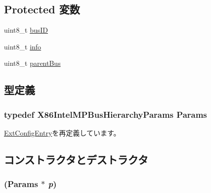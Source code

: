 \subsection*{Protected 変数}
\begin{DoxyCompactItemize}
\item 
uint8\_\-t \hyperlink{classX86ISA_1_1IntelMP_1_1BusHierarchy_ac86b1934f811ad40b20b27d29c52a5d3}{busID}
\item 
uint8\_\-t \hyperlink{classX86ISA_1_1IntelMP_1_1BusHierarchy_a3b5693c71298b922c6188573f2474227}{info}
\item 
uint8\_\-t \hyperlink{classX86ISA_1_1IntelMP_1_1BusHierarchy_a41f801fc3a61f3e7791b38d67321b6f5}{parentBus}
\end{DoxyCompactItemize}


\subsection{型定義}
\hypertarget{classX86ISA_1_1IntelMP_1_1BusHierarchy_a58526583d25b12675822cc32f4617567}{
\subsubsection[{Params}]{\setlength{\rightskip}{0pt plus 5cm}typedef X86IntelMPBusHierarchyParams {\bf Params}}}
\label{classX86ISA_1_1IntelMP_1_1BusHierarchy_a58526583d25b12675822cc32f4617567}


\hyperlink{classX86ISA_1_1IntelMP_1_1ExtConfigEntry_ac05617332b889b2a33387663c048f2a9}{ExtConfigEntry}を再定義しています。

\subsection{コンストラクタとデストラクタ}
\hypertarget{classX86ISA_1_1IntelMP_1_1BusHierarchy_a05705f033123ff45a5d21402943e1dbc}{
\subsubsection[{BusHierarchy}]{ ({\bf Params} $\ast$ {\em p})}}
\label{classX86ISA_1_1IntelMP_1_1BusHierarchy_a05705f033123ff45a5d21402943e1dbc}




